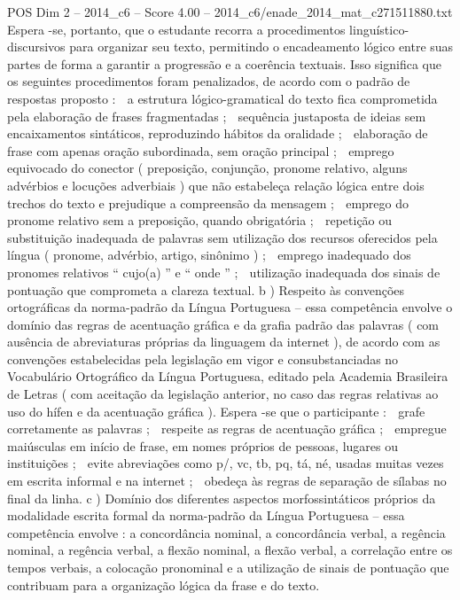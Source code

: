 \begin{textsample}{POS Dim 2 – 2014\_c6 – Score 4.00 – 2014\_c6/enade\_2014\_mat\_c271511880.txt}
Espera -se, portanto, que o estudante recorra a procedimentos linguístico-discursivos para organizar seu texto, permitindo o encadeamento lógico entre suas partes de forma a garantir a progressão e a coerência textuais.
Isso significa que os seguintes procedimentos foram penalizados, de acordo com o padrão de respostas proposto :  a estrutura lógico-gramatical do texto fica comprometida pela elaboração de frases fragmentadas ;  sequência justaposta de ideias sem encaixamentos sintáticos, reproduzindo hábitos da oralidade ;  elaboração de frase com apenas oração subordinada, sem oração principal ;  emprego equivocado do conector ( preposição, conjunção, pronome relativo, alguns advérbios e locuções adverbiais ) que não estabeleça relação lógica entre dois trechos do texto e prejudique a compreensão da mensagem ;  emprego do pronome relativo sem a preposição, quando obrigatória ;  repetição ou substituição inadequada de palavras sem utilização dos recursos oferecidos pela língua ( pronome, advérbio, artigo, sinônimo ) ;  emprego inadequado dos pronomes relativos “ cujo(a) ” e “ onde ” ;  utilização inadequada dos sinais de pontuação que comprometa a clareza textual. b ) Respeito às convenções ortográficas da norma-padrão da Língua Portuguesa – essa competência envolve o domínio das regras de acentuação gráfica e da grafia padrão das palavras ( com ausência de abreviaturas próprias da linguagem da internet ), de acordo com as convenções estabelecidas pela legislação em vigor e consubstanciadas no Vocabulário Ortográfico da Língua Portuguesa, editado pela Academia Brasileira de Letras ( com aceitação da legislação anterior, no caso das regras relativas ao uso do hífen e da acentuação gráfica ).
Espera -se que o participante :  grafe corretamente as palavras ;  respeite as regras de acentuação gráfica ;  empregue maiúsculas em início de frase, em nomes próprios de pessoas, lugares ou instituições ;  evite abreviações como p/, vc, tb, pq, tá, né, usadas muitas vezes em escrita informal e na internet ;  obedeça às regras de separação de sílabas no final da linha. c ) Domínio dos diferentes aspectos morfossintáticos próprios da modalidade escrita formal da norma-padrão da Língua Portuguesa – essa competência envolve : a concordância nominal, a concordância verbal, a regência nominal, a regência verbal, a flexão nominal, a flexão verbal, a correlação entre os tempos verbais, a colocação pronominal e a utilização de sinais de pontuação que contribuam para a organização lógica da frase e do texto.

\end{textsample}
